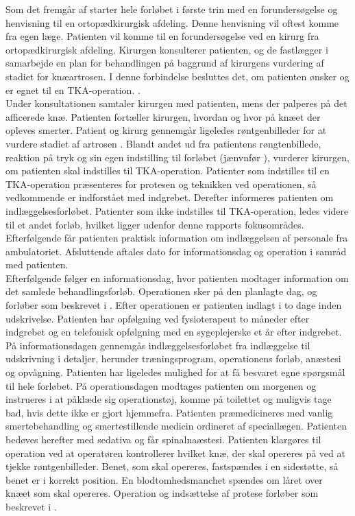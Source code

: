Som det fremgår af  starter hele forløbet i første trin med en forundersøgelse og henvisning til en ortopædkirurgisk afdeling. Denne henvisning vil oftest komme fra egen læge. Patienten vil komme til en forundersøgelse ved en kirurg fra ortopædkirurgisk afdeling. Kirurgen konsulterer patienten, og de fastlægger i samarbejde en plan for behandlingen på baggrund af kirurgens vurdering af stadiet for knæartrosen. I denne forbindelse besluttes det, om patienten ønsker og er egnet til en TKA-operation. \citep{pritka2015}. \\
Under konsultationen samtaler kirurgen med patienten, mens der palperes på det afficerede knæ. Patienten fortæller kirurgen, hvordan og hvor på knæet der opleves smerter. Patient og kirurg gennemgår ligeledes røntgenbilleder for at vurdere stadiet af artrosen \citep{pritka2015}.
Blandt andet ud fra patientens røngtenbillede, reaktion på tryk og sin egen indstilling til forløbet (jænvnfør ), vurderer kirurgen, om patienten skal indstilles til TKA-operation. Patienter som indstilles til en TKA-operation præsenteres for protesen og teknikken ved operationen, så vedkommende er indforstået med indgrebet. Derefter informeres patienten om indlæggelsesforløbet. Patienter som ikke indstilles til TKA-operation, ledes videre til et andet forløb, hvilket ligger udenfor denne rapports fokusområdes.
Efterfølgende får patienten praktisk information om indlæggelsen af personale fra ambulatoriet. Afsluttende aftales dato for informationsdag og operation i samråd med patienten. \citep{pritka2015} \\
Efterfølgende følger en informationsdag, hvor patienten modtager information om det samlede behandlingsforløb. Operationen sker på den planlagte dag, og forløber som beskrevet i . Efter operationen er patienten indlagt i to dage inden udskrivelse. Patienten har opfølgning ved fysioterapeut to måneder efter indgrebet og en telefonisk opfølgning med en sygeplejerske et år efter indgrebet. \citep{pritka2015} \\
På informationsdagen gennemgås indlæggelsesforløbet fra indlæggelse til udskrivning i detaljer, herunder træningsprogram, operationens forløb, anæstesi og opvågning. Patienten har ligeledes mulighed for at få besvaret egne spørgsmål til hele forløbet. 
På operationsdagen modtages patienten om morgenen og instrueres i at påklæde sig operationstøj, komme på toilettet og muligvis tage bad, hvis dette ikke er gjort hjemmefra. Patienten præmedicineres med vanlig smertebehandling og smertestillende medicin ordineret af speciallægen. Patienten bedøves herefter med sedativa og får spinalnaæstesi. Patienten klargøres til operation ved at operatøren kontrollerer hvilket knæ, der skal opereres på ved at tjekke røntgenbilleder. Benet, som skal opereres, fastspændes i en sidestøtte, så benet er i korrekt position. En blodtomhedsmanchet spændes om låret over knæet som skal opereres. Operation og indsættelse af protese forløber som beskrevet i . \citep{pritka2015} \\
